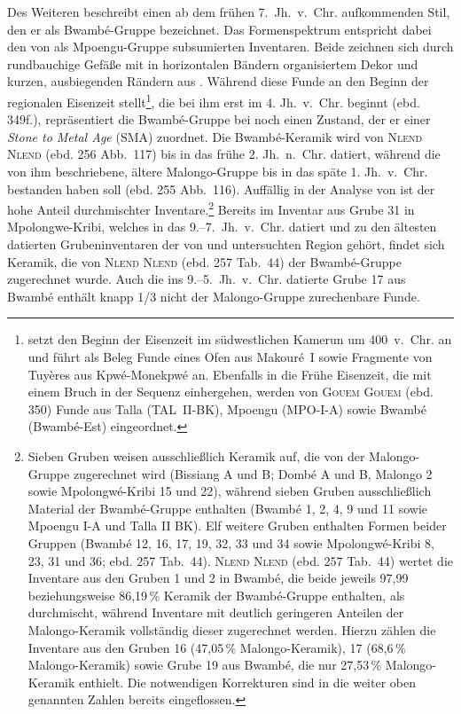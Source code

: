 Des Weiteren beschreibt \textcite[255]{NlendNlend.20132014} einen ab dem frühen 7.~Jh.~v.~Chr. aufkommenden Stil, den er als Bwambé-Gruppe bezeichnet. Das Formenspektrum entspricht dabei den von \textcite[352--358, 354 Abb.~17.6]{GouemGouem.20102011} als Mpoengu-Gruppe subsumierten Inventaren. Beide zeichnen sich durch rundbauchige Gefäße mit in horizontalen Bändern organisiertem Dekor und kurzen, ausbiegenden Rändern aus \parencite[ebd. 352--358, 354 Abb.~17.6; ][252 Abb.~114]{NlendNlend.20132014}. Während \textcite{GouemGouem.20102011} diese Funde an den Beginn der regionalen Eisenzeit stellt\footnote{\textcite[349f.]{GouemGouem.20102011} setzt den Beginn der Eisenzeit im südwestlichen Kamerun um 400~v.~Chr. an und führt als Beleg Funde eines Ofen aus Makouré~I sowie Fragmente von Tuyères aus Kpwé-Monekpwé an. Ebenfalls in die Frühe Eisenzeit, die mit einem Bruch in der Sequenz einhergehen, werden von \textsc{Gouem Gouem} (ebd. 350) Funde aus Talla (TAL~II-BK), Mpoengu (MPO-I-A) sowie Bwambé (Bwambé-Est) eingeordnet.}, die bei ihm erst im 4. Jh.~v.~Chr. beginnt (ebd. 349f.), repräsentiert die Bwambé-Gruppe bei \textcite{NlendNlend.20132014} noch einen Zustand, der er einer \textit{Stone to Metal Age} (SMA) zuordnet. Die Bwambé-Keramik wird von \textsc{Nlend Nlend} (ebd. 256 Abb.~117) bis in das frühe 2. Jh.~n.~Chr. datiert, während die von ihm beschriebene, ältere Malongo-Gruppe bis in das späte 1. Jh.~v.~Chr. bestanden haben soll (ebd. 255 Abb.~116). Auffällig in der Analyse von \textcite{NlendNlend.20132014} ist der hohe Anteil durchmischter Inventare.\footnote{Sieben Gruben weisen ausschließlich Keramik auf, die von \textcite{NlendNlend.20132014} der Malongo-Gruppe zugerechnet wird (Bissiang A und B; Dombé A und B, Malongo 2 sowie Mpolongwé-Kribi 15 und 22), während sieben Gruben ausschließlich Material der Bwambé-Gruppe enthalten (Bwambé 1, 2, 4, 9 und 11 sowie Mpoengu I-A und Talla II BK). Elf weitere Gruben enthalten Formen beider Gruppen (Bwambé 12, 16, 17, 19, 32, 33 und 34 sowie Mpolongwé-Kribi 8, 23, 31 und 36; ebd. 257 Tab.~44). \textsc{Nlend Nlend} (ebd. 257 Tab.~44) wertet die Inventare aus den Gruben 1 und 2 in Bwambé, die beide jeweils 97,99 beziehungsweise 86,19\,\% Keramik der Bwambé-Gruppe enthalten, als durchmischt, während Inventare mit deutlich geringeren Anteilen der Malongo-Keramik vollständig dieser zugerechnet werden. Hierzu zählen die Inventare aus den Gruben 16 (47,05\,\% Malongo-Keramik), 17 (68,6\,\% Malongo-Keramik) sowie Grube 19 aus Bwambé, die nur 27,53\,\% Malongo-Keramik enthielt. Die notwendigen Korrekturen sind in die weiter oben genannten Zahlen bereits eingeflossen.} Bereits im Inventar aus Grube 31 in Mpolongwe-Kribi, welches in das 9.--7.~Jh.~v.~Chr. datiert und zu den ältesten datierten Grubeninventaren der von \textcite{GouemGouem.20102011} und \textcite{NlendNlend.20132014} untersuchten Region gehört, findet sich Keramik, die von \textsc{Nlend Nlend} (ebd. 257 Tab.~44) der Bwambé-Gruppe zugerechnet wurde. Auch die ins 9.--5.~Jh.~v.~Chr. datierte Grube 17 aus Bwambé enthält knapp 1/3 nicht der Malongo-Gruppe zurechenbare Funde. 

